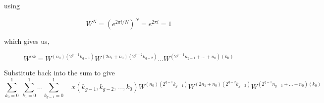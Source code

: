 \documentclass{article}
\begin{document}
using

\begin{displaymath}
W^N = (e^{2 \pi i / N})^N = e^{2 \pi i}=1
\end{displaymath}

which gives us,

\begin{displaymath}
W^{n k} = 
W^{ (n_0) (2^{g-1}k_{g-1})} 
W^{(2 n_1 + n_0) (2^{g-2}k_{g-2})}  \ldots 
W^{(2^{g-1} n_{g-1} + \ldots + n_0) (k_0)}
\end{displaymath}

Substitute back into the sum to give
\begin{displaymath}
\sum_{k_0=0}^1 \: \sum_{k_1=0}^1\ldots \sum_{k_{g-1}=0}^1 \quad x(k_{g-1}, k_{g-2}, \ldots , k_0)
W^{ (n_0) (2^{g-1}k_{g-1})} 
W^{(2 n_1 + n_0) (2^{g-2}k_{g-2})} 
W^{(2^{g-1} n_{g-1} + \ldots + n_0) (k_0)}
\end{displaymath}
\end{document}
